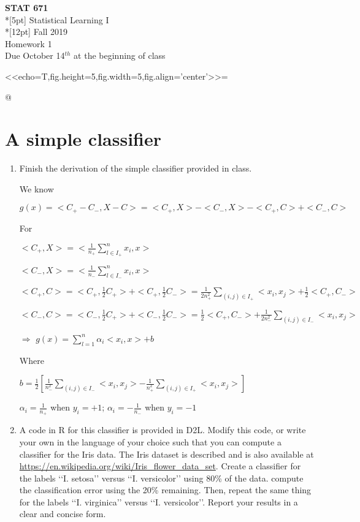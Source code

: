 \documentclass[12pt]{article}
\begin{document}
\thispagestyle{empty}
\vspace{10pt}
\begin{center}
{\large\bf STAT 671}    \\*[5pt] {\Large Statistical Learning I}
\\*[12pt] {\large Fall 2019}
\\ {\large Homework 1}
\\ {\large Due October 14$^{th}$ at the beginning of class}
\end{center}
\vspace{1cm}
\noindent

<<echo=T,fig.height=5,fig.width=5,fig.align='center'>>=


@

\section{A simple classifier}
\begin{enumerate}
\item Finish the derivation of the simple classifier provided in class. 

We know 

$g(x)=<C_+-C_-,X-C>=<C_+,X>-<C_-,X>-<C_+,C>+<C_-,C>$

For 

$<C_+,X>=<\frac1{n_{+}}\sum\limits_{l\in I_+}^nx_i,x>$

$<C_-,X>=<\frac1{n_{-}}\sum\limits_{l\in I_-}^nx_i,x>$

$<C_+,C>=<C_+,\frac12C_+>+<C_+,\frac12C_->=\frac1{2n_{+}^2}\sum\limits_{(i,j)\in I_{+}}<x_i,x_j>+\frac12<C_+,C_->$

$<C_-,C>=<C_-,\frac12C_+>+<C_-,\frac12C_->=\frac12<C_+,C_->+\frac1{2n_{-}^2}\sum\limits_{(i,j)\in I_{-}}<x_i,x_j>$

$\Longrightarrow$
$g(x)=\sum_{l=1}^n\alpha_i<x_i,x>+b$

Where

$b=\frac12\left[\frac1{n_{-}^2}\sum\limits_{(i,j)\in I_{-}}<x_i,x_j>-\frac1{n_{+}^2}\sum\limits_{(i,j)\in I_{+}}<x_i,x_j>\right]$

$\alpha_i=\frac{1}{n_{+}}$ when $y_i=+1$; $\alpha_i=-\frac{1}{n_{-}}$ when $y_i=-1$


\item A code in R for this classifier is provided in D2L. Modify this code, or write your own in the language of your choice such that you can compute a classifier for the Iris data.  The Iris dataset is described and is also available at \url{ https://en.wikipedia.org/wiki/Iris_flower_data_set}. Create a classifier for the labels \lq\lq{}I. setosa\rq\rq{} versus \lq\lq{}I. versicolor\rq\rq{} using 80\% of the data. 
compute the classification error using the 20\% remaining. Then, repeat the same thing for the labels \lq\lq{}I. virginica\rq\rq{} versus \lq\lq{}I. versicolor\rq\rq{}. Report your results in a clear and concise form. 
\end{enumerate}
\end{document}

